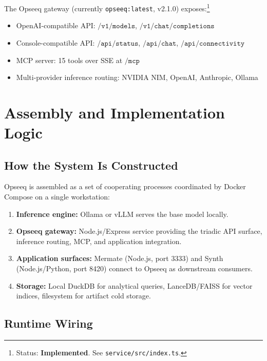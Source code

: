 \documentclass[11pt]{article}
\theoremstyle{remark}
\begin{document}
The Opseeq gateway (currently \texttt{opseeq:latest}, v2.1.0) exposes:\footnote{Status: \textbf{Implemented}. See \texttt{service/src/index.ts}.}
\begin{itemize}
  \item OpenAI-compatible API: $\texttt{/v1/models}$, $\texttt{/v1/chat/completions}$
  \item Console-compatible API: $\texttt{/api/status}$, $\texttt{/api/chat}$, $\texttt{/api/connectivity}$
  \item MCP server: 15 tools over SSE at $\texttt{/mcp}$
  \item Multi-provider inference routing: NVIDIA NIM, OpenAI, Anthropic, Ollama
\end{itemize}

\section{Assembly and Implementation Logic}
\label{sec:assembly}

\subsection{How the System Is Constructed}

Opseeq is assembled as a set of cooperating processes coordinated by Docker Compose on a single workstation:

\begin{enumerate}
  \item \textbf{Inference engine:} Ollama or vLLM serves the base model locally.
  \item \textbf{Opseeq gateway:} Node.js/Express service providing the triadic API surface, inference routing, MCP, and application integration.
  \item \textbf{Application surfaces:} Mermate (Node.js, port 3333) and Synth (Node.js/Python, port 8420) connect to Opseeq as downstream consumers.
  \item \textbf{Storage:} Local DuckDB for analytical queries, LanceDB/FAISS for vector indices, filesystem for artifact cold storage.
\end{enumerate}

\subsection{Runtime Wiring}
\end{document}
